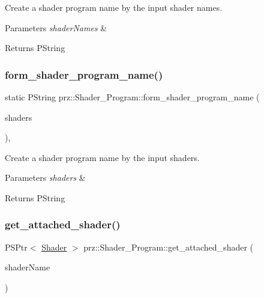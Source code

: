 Create a shader program name by the input shader names. 


\begin{DoxyParams}{Parameters}
{\em shader\+Names} & \\
\hline
\end{DoxyParams}
\begin{DoxyReturn}{Returns}
P\+String 
\end{DoxyReturn}
\mbox{\label{classprz_1_1_shader___program_ac60371217614e7962a32202f88a62d0e}} 
\subsubsection{\texorpdfstring{form\_shader\_program\_name()}{form\_shader\_program\_name()}\hspace{0.1cm}{\footnotesize\ttfamily [2/2]}}
{\footnotesize\ttfamily static P\+String prz\+::\+Shader\+\_\+\+Program\+::form\+\_\+shader\+\_\+program\+\_\+name (\begin{DoxyParamCaption}\item[{P\+Buffer$<$ P\+S\+Ptr$<$ \mbox{\hyperlink{classprz_1_1_shader}{Shader}} $>$ $>$ \&}]{shaders }\end{DoxyParamCaption})\hspace{0.3cm}{\ttfamily [inline]}, {\ttfamily [static]}}



Create a shader program name by the input shaders. 


\begin{DoxyParams}{Parameters}
{\em shaders} & \\
\hline
\end{DoxyParams}
\begin{DoxyReturn}{Returns}
P\+String 
\end{DoxyReturn}
\mbox{\label{classprz_1_1_shader___program_a14596994d22a0560b9f48a810dec1bef}} 
\subsubsection{\texorpdfstring{get\_attached\_shader()}{get\_attached\_shader()}}
{\footnotesize\ttfamily P\+S\+Ptr$<$ \mbox{\hyperlink{classprz_1_1_shader}{Shader}} $>$ prz\+::\+Shader\+\_\+\+Program\+::get\+\_\+attached\+\_\+shader (\begin{DoxyParamCaption}\item[{const P\+String \&}]{shader\+Name }\end{DoxyParamCaption})\hspace{0.3cm}{\ttfamily [inline]}}



